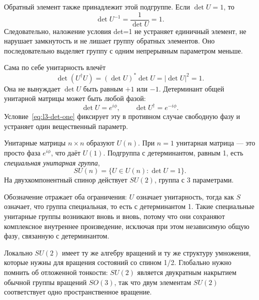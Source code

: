 Обратный элемент также принадлежит этой подгруппе. Если \(\det U=1\), то
\begin{equation}
\det U^{-1}=\frac{1}{\det U}=1.
\end{equation}
Следовательно, наложение условия det=1 не устраняет единичный элемент, не нарушает замкнутость и не лишает группу обратных элементов. Оно последовательно выделяет группу с одним непрерывным параметром меньше.

Сама по себе унитарность влечёт
\begin{equation}
\det(U^\dagger U)=
(\det U)^*\det U
=|\det U|^2=1.
\end{equation}
Она не вынуждает \(\det U\) быть равным \(+1\) или \(-1\). Детерминант общей унитарной матрицы может быть любой фазой:
\begin{equation}
\det U=e^{i\phi},
\qquad
\det U^\dagger=e^{-i\phi}.
\end{equation}
Условие~\eqref{eq:l3-det-one} фиксирует эту в противном случае свободную фазу и устраняет один вещественный параметр.

\begin{classroomqa}
\end{classroomqa}

Унитарные матрицы \(n\times n\) образуют \(U(n)\). При \(n=1\) унитарная матрица — это просто фаза \(e^{i\phi}\), что даёт \(U(1)\). Подгруппа с детерминантом, равным 1, есть \emph{специальная унитарная группа},
\begin{equation}
SU(n)=\{U\in U(n):\det U=1\}.
\end{equation}
На двухкомпонентный спинор действует \(SU(2)\), группа с 3 параметрами.

Обозначение отражает оба ограничения: \(U\) означает унитарность, тогда как \(S\) означает, что группа специальная, то есть с детерминантом 1. Такие специальные унитарные группы возникают вновь и вновь, потому что они сохраняют комплексное внутреннее произведение, исключая при этом независимую общую фазу, связанную с детерминантом.

Локально \(SU(2)\) имеет ту же алгебру вращений и ту же структуру умножения, которые нужны для вращения состояний со спином 1/2. Глобально нужно помнить об отложенной тонкости: \(SU(2)\) является двукратным накрытием обычной группы вращений \(SO(3)\), так что двум элементам \(SU(2)\) соответствует одно пространственное вращение. 

